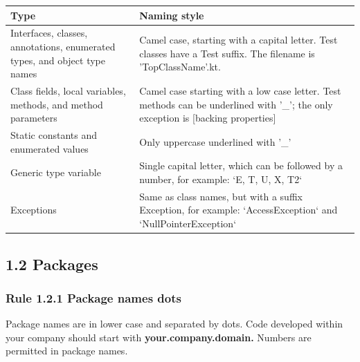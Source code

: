 {{{{{{{{\begin{center}

\begin{tabular}{ |p{7.5cm}|p{7.5cm}| }

\hline

Type&Naming style\\

\hline

 Interfaces, classes, annotations, enumerated types, and object type names & Camel case, starting with a capital letter. Test classes have a Test suffix. The filename is 'TopClassName'.kt.  \\

 Class fields, local variables, methods, and method parameters & Camel case starting with a low case letter. Test methods can be underlined with '\_'; the only exception is [backing properties]\\

 Static constants and enumerated values & Only uppercase underlined with '\_' \\

 Generic type variable & Single capital letter, which can be followed by a number, for example: `E, T, U, X, T2` \\

 Exceptions & Same as class names, but with a suffix Exception, for example: `AccessException` and `NullPointerException`\\

\hline

\end{tabular}

\end{center}

\subsection*{\textbf{1.2 Packages}}

\label{sec:1.2}



\subsubsection*{\textbf{Rule 1.2.1 Package names dots}}
\leavevmode\newline


Package names are in lower case and separated by dots. Code developed within your company should start with \textbf{your.company.domain.} Numbers are permitted in package names.

}}}}}}}}

